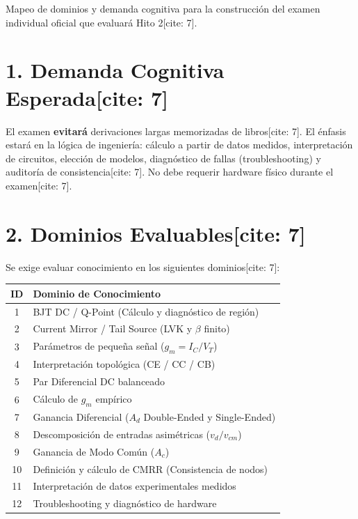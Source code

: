 \documentclass[11pt, a4paper]{article}
\begin{document}
\begin{tcolorbox}[colback=red!5, colframe=red!70!black, title=\textbf{Documento Docente Reservado: Blueprint Examen W09S02}]
    Mapeo de dominios y demanda cognitiva para la construcción del examen individual oficial que evaluará Hito 2[cite: 7].
\end{tcolorbox}

\section*{1. Demanda Cognitiva Esperada[cite: 7]}
El examen \textbf{evitará} derivaciones largas memorizadas de libros[cite: 7]. El énfasis estará en la lógica de ingeniería: cálculo a partir de datos medidos, interpretación de circuitos, elección de modelos, diagnóstico de fallas (troubleshooting) y auditoría de consistencia[cite: 7]. No debe requerir hardware físico durante el examen[cite: 7].

\section*{2. Dominios Evaluables[cite: 7]}
Se exige evaluar conocimiento en los siguientes dominios[cite: 7]:

\renewcommand{\arraystretch}{1.5}
\begin{tabularx}{\textwidth}{|c|>{\raggedright\arraybackslash}X|}
\hline
\rowcolor{ucbblue!20}
\textbf{ID} & \textbf{Dominio de Conocimiento} \\ \hline
1 & BJT DC / Q-Point (Cálculo y diagnóstico de región) \\ \hline
2 & Current Mirror / Tail Source (LVK y $\beta$ finito) \\ \hline
3 & Parámetros de pequeña señal ($g_m = I_C/V_T$) \\ \hline
4 & Interpretación topológica (CE / CC / CB) \\ \hline
5 & Par Diferencial DC balanceado \\ \hline
6 & Cálculo de $g_m$ empírico \\ \hline
7 & Ganancia Diferencial ($A_d$ Double-Ended y Single-Ended) \\ \hline
8 & Descomposición de entradas asimétricas ($v_d / v_{cm}$) \\ \hline
9 & Ganancia de Modo Común ($A_c$) \\ \hline
10 & Definición y cálculo de CMRR (Consistencia de nodos) \\ \hline
11 & Interpretación de datos experimentales medidos \\ \hline
12 & Troubleshooting y diagnóstico de hardware \\ \hline
\end{tabularx}
\end{document}
